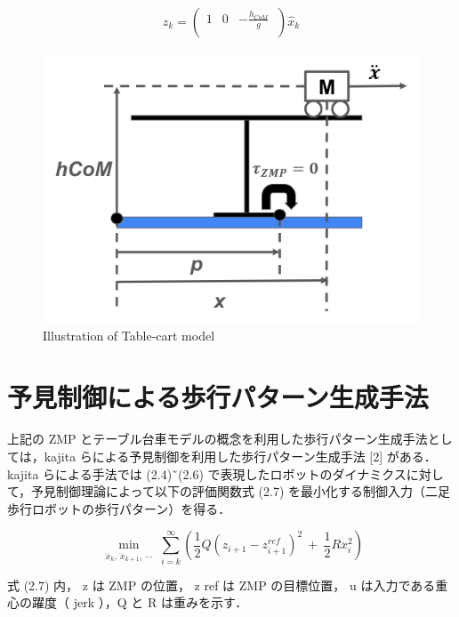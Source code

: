 \begin{equation}
     z_k=\left(\begin{matrix}1&0&-\frac{h_{CoM}}{g}\ \\\end{matrix}\right)\widehat{x}_k
     \label{eq:2.6}
\end{equation}

\begin{figure}[H]
  \centering
 \includegraphics[keepaspectratio, scale=0.5]
      {images/walk/table.png}
 \caption{Illustration of Table-cart model}
 \label{Fig:Illustration of Table-cart model}
\end{figure}

\section{予見制御による歩行パターン生成手法}
上記の ZMP とテーブル台車モデルの概念を利用した歩行パターン生成手法としては，kajita らによる予見制御を利用した歩行パターン生成手法 [2] がある． kajita らによる手法では (2.4)˜(2.6) で表現したロボットのダイナミクスに対して，予見制御理論によって以下の評価関数式 (2.7) を最小化する制御入力（二足歩行ロボットの歩行パターン）を得る．


\begin{equation}
     \min_{\substack{{\dddot{x}}_k,\ {\dddot{x}}_{k+1},\ \cdots}} \sum_{i=k}^{\infty}\left(\frac{1}{2}Q\left(z_{i+1}-z_{i+1}^{ref}\right)^2\ +\ \frac{1}{2}R{\dddot{x}}_i^2\right)
\end{equation}


式 (2.7) 内， z は ZMP の位置， z ref は ZMP の目標位置， u は入力である重心の躍度（ jerk ），Q と R は重みを示す．
